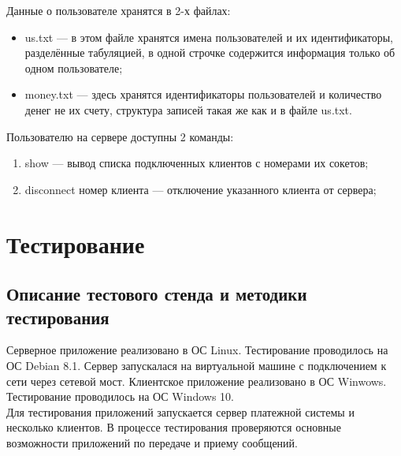 \documentclass[12pt,a4paper]{report}
\begin{document}
Данные о пользователе хранятся в 2-х файлах:
\begin{itemize}
		\item us.txt --- в этом файле хранятся имена пользователей и их идентификаторы, разделённые табуляцией, в одной строчке содержится информация только об одном пользователе;
		\item money.txt --- здесь хранятся идентификаторы пользователей и количество денег не их счету, структура записей такая же как и в файле us.txt.
		\end{itemize}
Пользователю на сервере доступны 2 команды:
	\begin{enumerate}
	\item show --- вывод списка подключенных клиентов с номерами их сокетов;
	\item disconnect номер клиента --- отключение указанного клиента от сервера;
	\end{enumerate}
\section{Тестирование}
\subsection{Описание тестового стенда и методики тестирования}
\label{testing_stand_tcp}
Серверное приложение реализовано в ОС Linux. Тестирование проводилось на ОС Debian 8.1. Сервер запускалася на виртуальной машине с подключением к сети через сетевой мост. Клиентское приложение реализовано в ОС Winwows. Тестирование проводилось на ОС Windows 10.
\\Для тестирования приложений запускается сервер платежной системы и несколько клиентов. В процессе тестирования проверяются основные возможности приложений по передаче и приему сообщений.
\end{document}
